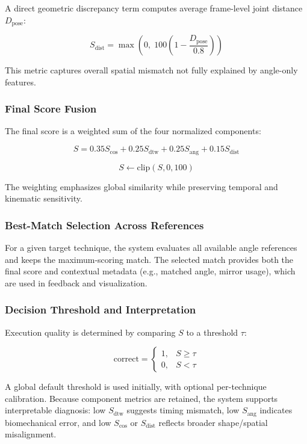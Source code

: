 \documentclass[12pt]{article}
\begin{document}
{A direct geometric discrepancy term computes average frame-level joint distance \(D_{\text{pose}}\):

\[
S_{\text{dist}} = \max\left(0,\;100\left(1-\frac{D_{\text{pose}}}{0.8}\right)\right)
\]

This metric captures overall spatial mismatch not fully explained by angle-only features.

\subsubsection{Final Score Fusion}

The final score is a weighted sum of the four normalized components:

\[
S = 0.35S_{\text{cos}} + 0.25S_{\text{dtw}} + 0.25S_{\text{ang}} + 0.15S_{\text{dist}}
\]

\[
S \leftarrow \text{clip}(S,0,100)
\]

The weighting emphasizes global similarity while preserving temporal and kinematic sensitivity.

\subsubsection{Best-Match Selection Across References}

For a given target technique, the system evaluates all available angle references and keeps the maximum-scoring match. The selected match provides both the final score and contextual metadata (e.g., matched angle, mirror usage), which are used in feedback and visualization.

\subsubsection{Decision Threshold and Interpretation}

Execution quality is determined by comparing \(S\) to a threshold \(\tau\):

\[
\text{correct}=
\begin{cases}
1, & S \ge \tau \\
0, & S < \tau
\end{cases}
\]

A global default threshold is used initially, with optional per-technique calibration. Because component metrics are retained, the system supports interpretable diagnosis: low \(S_{\text{dtw}}\) suggests timing mismatch, low \(S_{\text{ang}}\) indicates biomechanical error, and low \(S_{\text{cos}}\) or \(S_{\text{dist}}\) reflects broader shape/spatial misalignment.

}
\end{document}
